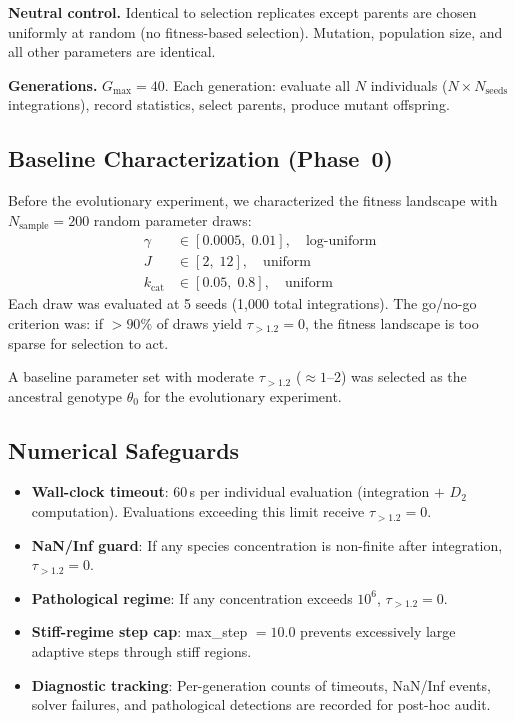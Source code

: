 \documentclass[twocolumn,showpacs,preprintnumbers,amsmath,amssymb,prd,floatfix]{revtex4-2}
\newcommand{\tauexp}{\tau_{>1.2}}
\newcommand{\Dtwo}{D_2}
\newcommand{\kcat}{k_{\mathrm{cat}}}
\begin{document}
\textbf{Neutral control.} Identical to selection replicates except parents are chosen uniformly at random (no fitness-based selection). Mutation, population size, and all other parameters are identical.

\textbf{Generations.} $G_\text{max} = 40$. Each generation: evaluate all $N$ individuals ($N \times N_\text{seeds}$ integrations), record statistics, select parents, produce mutant offspring.

\subsection{Baseline Characterization (Phase~0)}
\label{sec:phase0}

Before the evolutionary experiment, we characterized the fitness landscape with $N_\text{sample} = 200$ random parameter draws:
\begin{align}
\gamma &\in [0.0005,\; 0.01], \quad \text{log-uniform} \\
J      &\in [2,\; 12], \quad \text{uniform} \\
\kcat  &\in [0.05,\; 0.8], \quad \text{uniform}
\end{align}
Each draw was evaluated at 5 seeds (1{,}000 total integrations). The go/no-go criterion was: if $> 90\%$ of draws yield $\tauexp = 0$, the fitness landscape is too sparse for selection to act.

A baseline parameter set with moderate $\tauexp$ ($\approx 1$--2) was selected as the ancestral genotype $\theta_0$ for the evolutionary experiment.

\subsection{Numerical Safeguards}

\begin{itemize}
\item \textbf{Wall-clock timeout}: 60\,s per individual evaluation (integration $+$ $\Dtwo$ computation). Evaluations exceeding this limit receive $\tauexp = 0$.

\item \textbf{NaN/Inf guard}: If any species concentration is non-finite after integration, $\tauexp = 0$.

\item \textbf{Pathological regime}: If any concentration exceeds $10^6$, $\tauexp = 0$.

\item \textbf{Stiff-regime step cap}: max\_step $= 10.0$ prevents excessively large adaptive steps through stiff regions.

\item \textbf{Diagnostic tracking}: Per-generation counts of timeouts, NaN/Inf events, solver failures, and pathological detections are recorded for post-hoc audit.
\end{itemize}
\end{document}
